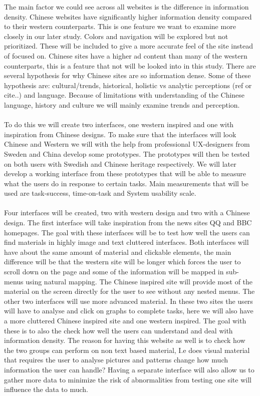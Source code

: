  The main factor we could see across all websites is the difference in information density. Chinese websites have significantly higher information density compared to their western counterparts. This is one feature we want to examine more closely in our later study. Colors and navigation will be explored but not prioritized. These will be included to give a more accurate feel of the site instead of focused on. Chinese sites have a higher ad content than many of the western counterparts, this is a feature that not will be looked into in this study.   There are several hypothesis for why Chinese sites are so information dense. Some of these hypothesis are: cultural/trends, historical, holistic vs analytic perceptions (ref or cite..) and language. Because of limitations with understanding of the Chinese language, history and culture we will mainly examine trends and perception.
 \\\\
  To do this we will create two interfaces, one western inspired and one with inspiration from Chinese designs. To make sure that the interfaces will look Chinese and Western we will with the help from professional UX-designers from Sweden and China develop some prototypes. The prototypes will then be tested on both users with Swedish and Chinese heritage respectively. We will later develop a working interface from these prototypes that will be able to measure what the users do in response to certain tasks. Main measurements that will be used are task-success, time-on-task and System usability scale. \cite{brooke1996sus} 
  \\\\
  Four interfaces will be created, two with western design and two with a Chinese design. The first interface will take inspiration from the news sites QQ and BBC homepages. The goal with these interfaces will be to test how well the users can find materials in highly image and text cluttered interfaces. Both interfaces will have about the same amount of material and clickable elements, the main difference will be that the western site will be longer which forces the user to scroll down on the page and some of the information will be mapped in sub-menus using natural mapping. \cite{Norman} The Chinese inspired site will provide most of the material on the screen directly for the user to see without any nested menus.  The other two interfaces will use more advanced material. In these two sites the users will have to analyse and click on graphs to complete tasks, here we will also have a more cluttered Chinese inspired site and one western inspired. The goal with these is to also the check how well the users can understand and deal with information density. The reason for having this website as well is to check how the two groups can perform on non text based material, I.e does visual material that requires the user to analyse pictures and patterns change how much information the user can handle? Having a separate interface will also allow us to gather more data to minimize the risk of abnormalities from testing one site will influence the data to much.
